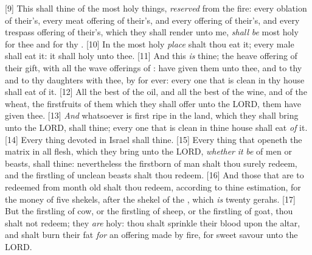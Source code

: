 [9] \textcolor[cmyk]{0.99998,1,0,0}{This shall  thine of the most holy things, \emph{reserved} from the fire: every oblation of their's, every meat offering of their's, and every  offering of their's, and every trespass offering of their's, which they shall render unto me, \emph{shall} \emph{be} most holy for thee and for thy .}
[10] \textcolor[cmyk]{0.99998,1,0,0}{In the most holy \emph{place} shalt thou eat it; every male shall eat it: it shall  holy unto thee.}
[11] \textcolor[cmyk]{0.99998,1,0,0}{And this \emph{is} thine; the heave offering of their gift, with all the wave offerings of :  have given them unto thee, and to thy  and to thy daughters with thee, by   for ever: every one that is clean in thy house shall eat of it.}
[12] \textcolor[cmyk]{0.99998,1,0,0}{All the best of the oil, and all the best of the wine, and of the wheat, the firstfruits of them which they shall offer unto the LORD, them have  given thee.}
[13] \textcolor[cmyk]{0.99998,1,0,0}{\emph{And} whatsoever is first ripe in the land, which they shall bring unto the LORD, shall  thine; every one that is clean in thine house shall eat \emph{of} it.}
[14] \textcolor[cmyk]{0.99998,1,0,0}{Every thing devoted in Israel shall  thine.}
[15] \textcolor[cmyk]{0.99998,1,0,0}{Every thing that openeth the matrix in all flesh, which they bring unto the LORD, \emph{whether} \emph{it} \emph{be} of men or beasts, shall  thine: nevertheless the firstborn of man shalt thou surely redeem, and the firstling of unclean beasts shalt thou redeem.}
[16] \textcolor[cmyk]{0.99998,1,0,0}{And those that are to  redeemed from  month old shalt thou redeem, according to thine estimation, for the money of five shekels, after the shekel of the , which \emph{is} twenty gerahs.}
[17] \textcolor[cmyk]{0.99998,1,0,0}{But the firstling of  cow, or the firstling of  sheep, or the firstling of  goat, thou shalt not redeem; they \emph{are} holy: thou shalt sprinkle their blood upon the altar, and shalt burn their fat \emph{for} an offering made by fire, for  sweet savour unto the LORD.}
